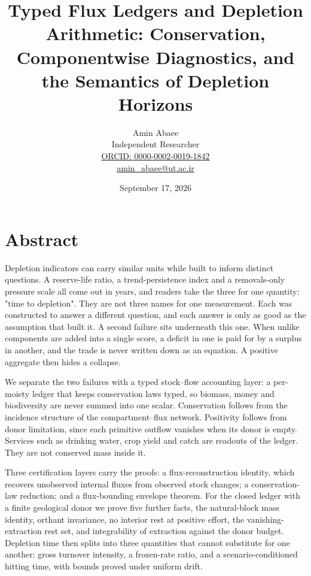 \documentclass[11pt]{article}
\begin{document}
\title{Typed Flux Ledgers and Depletion Arithmetic: Conservation, Componentwise Diagnostics, and the Semantics of Depletion Horizons}
\author{Amin Abaee\\[0.35em]
{\small Independent Researcher}\\[0.55em]
{\small\href{https://orcid.org/\allowbreak{}0000-0002-0019-1842}{ORCID: 0000-0002-0019-1842}}\\[0.3em]
{\small\href{mailto:amin\_abaee@ut.ac.ir}{amin\_abaee@ut.ac.ir}}}
\date{September 17, 2026}
\maketitle

\section*{Abstract}\label{abstract}

Depletion indicators can carry similar units while built to inform distinct questions. A reserve-life ratio, a trend-persistence index and a removals-only pressure scale all come out in years, and readers take the three for one quantity: "time to depletion". They are not three names for one measurement. Each was constructed to answer a different question, and each answer is only as good as the assumption that built it. A second failure sits underneath this one. When unlike components are added into a single score, a deficit in one is paid for by a surplus in another, and the trade is never written down as an equation. A positive aggregate then hides a collapse.

We separate the two failures with a typed stock--flow accounting layer: a per-moiety ledger that keeps conservation laws typed, so biomass, money and biodiversity are never summed into one scalar. Conservation follows from the incidence structure of the compartment--flux network. Positivity follows from donor limitation, since each primitive outflow vanishes when its donor is empty. Services such as drinking water, crop yield and catch are readouts of the ledger. They are not conserved mass inside it.

Three certification layers carry the proofs: a flux-reconstruction identity, which recovers unobserved internal fluxes from observed stock changes; a conservation-law reduction; and a flux-bounding envelope theorem. For the closed ledger with a finite geological donor we prove five further facts, the natural-block mass identity, orthant invariance, no interior rest at positive effort, the vanishing-extraction rest set, and integrability of extraction against the donor budget. Depletion time then splits into three quantities that cannot substitute for one another: gross turnover intensity, a frozen-rate ratio, and a scenario-conditioned hitting time, with bounds proved under uniform drift.
\end{document}
